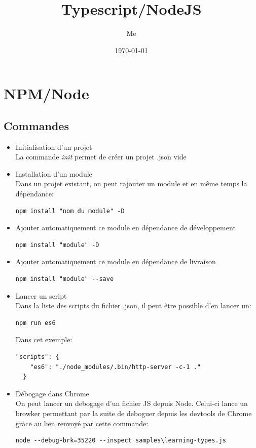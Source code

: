 \documentclass[12pt,oneside]{scrbook}
\title{Typescript/NodeJS}
\author{Me}
\date{\today}
\begin{document}
 
\maketitle 
\tableofcontents


\chapter{NPM/Node}
\section{Commandes}
\begin{itemize}
\item Initialisation d'un projet\\
La commande \textit{init} permet de créer un projet .json vide
\item Installation d'un module\\
Dans un projet existant, on peut rajouter un module et en même temps la dépendance:
\begin{verbatim}
npm install "nom du module" -D
\end{verbatim}

\item Ajouter automatiquement ce module en dépendance de développement
\begin{verbatim}
npm install "module" -D
\end{verbatim}
\item Ajouter automatiquement ce module en dépendance de livraison
\begin{verbatim}
npm install "module" --save
\end{verbatim}
\item Lancer un script\\
Dans la liste des scripts du fichier .json, il peut être possible d'en lancer un:
\begin{verbatim}
npm run es6
\end{verbatim}
Dans cet exemple:
\begin{verbatim}
"scripts": {
    "es6": "./node_modules/.bin/http-server -c-1 ."
  }
\end{verbatim}
\item Débogage dans Chrome\\
On peut lancer un debogage d'un fichier JS depuis Node. Celui-ci lance un browker permettant par la suite de deboguer depuis les devtools de Chrome gràce au lien renvoyé par cette commande:
\begin{verbatim}
node --debug-brk=35220 --inspect samples\learning-types.js
\end{verbatim}
\end{itemize}
\end{document}
